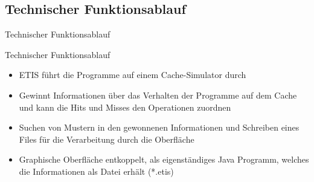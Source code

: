\subsection{Technischer Funktionsablauf}
\begin{frame}{Technischer Funktionsablauf}
\begin{block}{Technischer Funktionsablauf}
\begin{itemize}[<+->]
\pause\item ETIS führt die Programme auf einem Cache-Simulator durch
\item Gewinnt Informationen über das Verhalten der Programme auf dem Cache und kann die Hits und Misses den Operationen zuordnen
\item Suchen von Mustern in den gewonnenen Informationen und Schreiben eines Files für die Verarbeitung durch die Oberfläche
\item Graphische Oberfläche entkoppelt, als eigenständiges Java Programm, welches die Informationen als Datei erhält (*.etis)
\end{itemize}
\end{block}
\end{frame}

